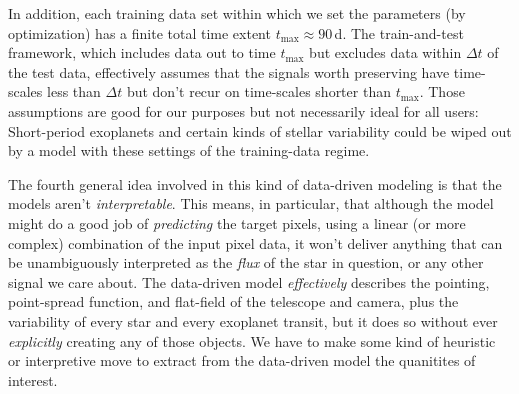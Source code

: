 \documentclass[12pt, preprint]{aastex}
\begin{document}
In addition, each training data set within which we set the parameters (by optimization) has a finite total time extent $t_{\max}\approx 90$\,d.
The train-and-test framework, which includes data out to time $t_{\max}$ but excludes data within $\Delta t$ of the test data,
  effectively assumes that the signals worth preserving have time-scales less than $\Delta t$ but don't recur on time-scales
  shorter than $t_{\max}$.
Those assumptions are good for our purposes but not necessarily ideal for all users:
Short-period exoplanets and certain kinds of stellar variability
  could be wiped out by a model with these settings of the training-data regime.

The fourth general idea involved in this kind of data-driven modeling is that the models aren't \emph{interpretable}.
This means, in particular, that although the model might do a good job of \emph{predicting} the target pixels,
  using a linear (or more complex) combination of the input pixel data,
  it won't deliver anything that can be unambiguously interpreted as the \emph{flux} of the star in question,
  or any other signal we care about.
The data-driven model \emph{effectively} describes the pointing, point-spread function, and flat-field
  of the telescope and camera,
  plus the variability of every star and every exoplanet transit,
  but it does so without ever \emph{explicitly} creating any of those objects.
We have to make some kind of heuristic or interpretive move to extract from the data-driven model the quanitites of interest.
\end{document}

